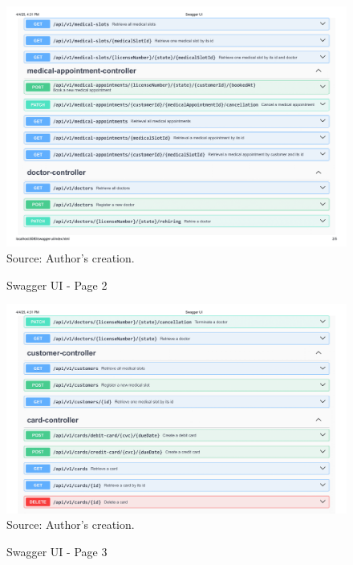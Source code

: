 \begin{landscape}
    \begin{figure}[H]
        \centering
        \caption{Swagger UI - Page 2}
        \includegraphics[width=1\linewidth]{figures/Swagger UI-2.png}
        \label{fig:swagger_ui_2}
        \\ \footnotesize Source: Author's creation.
    \end{figure}
\end{landscape}

\begin{landscape}
    \begin{figure}[H]
        \centering
        \caption{Swagger UI - Page 3}
        \includegraphics[width=1\linewidth]{figures/Swagger UI-3.png}
        \label{fig:swagger_ui_3}
        \\ \footnotesize Source: Author's creation.
    \end{figure}
\end{landscape}


